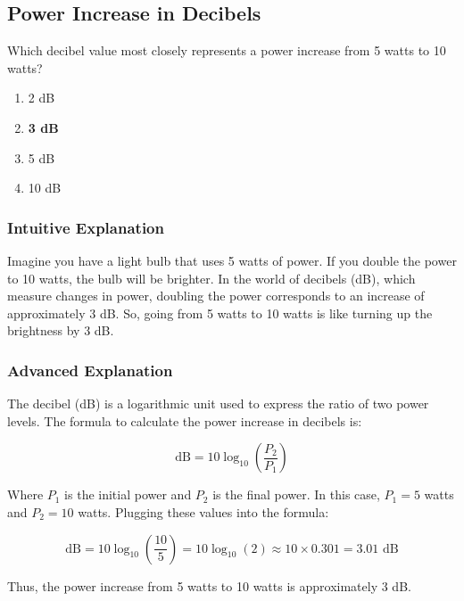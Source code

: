 \subsection{Power Increase in Decibels}
\label{T5B09}

\begin{tcolorbox}[colback=gray!10!white,colframe=black!75!black,title=T5B09]
Which decibel value most closely represents a power increase from 5 watts to 10 watts?
\begin{enumerate}[noitemsep]
    \item 2 dB
    \item \textbf{3 dB}
    \item 5 dB
    \item 10 dB
\end{enumerate}
\end{tcolorbox}

\subsubsection*{Intuitive Explanation}
Imagine you have a light bulb that uses 5 watts of power. If you double the power to 10 watts, the bulb will be brighter. In the world of decibels (dB), which measure changes in power, doubling the power corresponds to an increase of approximately 3 dB. So, going from 5 watts to 10 watts is like turning up the brightness by 3 dB.

\subsubsection*{Advanced Explanation}
The decibel (dB) is a logarithmic unit used to express the ratio of two power levels. The formula to calculate the power increase in decibels is:

\[
\text{dB} = 10 \log_{10}\left(\frac{P_2}{P_1}\right)
\]

Where \( P_1 \) is the initial power and \( P_2 \) is the final power. In this case, \( P_1 = 5 \) watts and \( P_2 = 10 \) watts. Plugging these values into the formula:

\[
\text{dB} = 10 \log_{10}\left(\frac{10}{5}\right) = 10 \log_{10}(2) \approx 10 \times 0.301 = 3.01 \text{ dB}
\]

Thus, the power increase from 5 watts to 10 watts is approximately 3 dB.